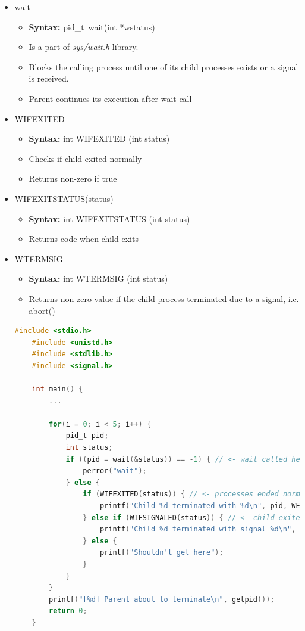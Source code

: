 \documentclass[12pt]{article}
\begin{document}
\begin{itemize}
    \item wait
    \begin{itemize}
        \item \textbf{Syntax:} pid\_t\ wait(int *wstatus)
        \item Is a part of \textit{sys/wait.h} library.
        \item Blocks the calling process until one of its child processes exists
        or a signal is received.
        \item Parent continues its execution after wait call
    \end{itemize}
    \item WIFEXITED
    \begin{itemize}
        \item \textbf{Syntax:} int WIFEXITED (int status)
        \item Checks if child exited normally
        \item Returns non-zero if true
    \end{itemize}
    \item WIFEXITSTATUS(status)
    \begin{itemize}
        \item \textbf{Syntax:} int WIFEXITSTATUS (int status)
        \item Returns code when child exits
    \end{itemize}
    \item WTERMSIG
    \begin{itemize}
        \item \textbf{Syntax:} int WTERMSIG (int status)
        \item Returns non-zero value if the child process terminated due to a signal,
        i.e. abort()
    \end{itemize}

    \begin{lstlisting}[language=c,caption={process\_example\_3.c}]
    #include <stdio.h>
    #include <unistd.h>
    #include <stdlib.h>
    #include <signal.h>

    int main() {
        ...

        for(i = 0; i < 5; i++) {
            pid_t pid;
            int status;
            if ((pid = wait(&status)) == -1) { // <- wait called here
                perror("wait");
            } else {
                if (WIFEXITED(status)) { // <- processes ended normally
                    printf("Child %d terminated with %d\n", pid, WEXITSTATUS(status));
                } else if (WIFSIGNALED(status)) { // <- child exited due to signal
                    printf("Child %d terminated with signal %d\n", pid, WTERMSIG(status));
                } else {
                    printf("Shouldn't get here");
                }
            }
        }
        printf("[%d] Parent about to terminate\n", getpid());
        return 0;
    }
    \end{lstlisting}
\end{itemize}
\end{document}
